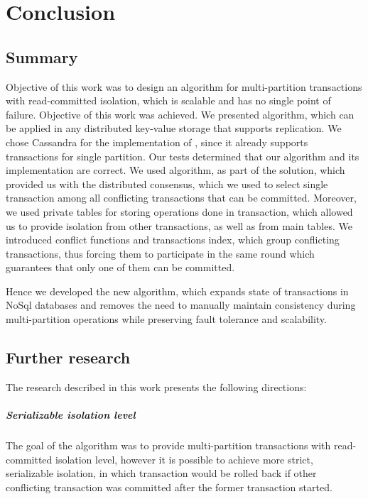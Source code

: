 
\chapter{Conclusion}\label{chapter:summary}

\section{Summary}
Objective of this work was to design an algorithm for multi-partition transactions with read-committed isolation, which is scalable and has no single point of failure. Objective of this work was achieved. We presented \mpt algorithm, which can be applied in any distributed key-value storage that supports replication.
We chose Cassandra for the implementation of \mpt, since it already supports transactions for single partition. Our tests determined that our algorithm and its implementation are correct. We used \paxos algorithm, as part of the solution, which provided us with the distributed consensus, which we used to select single transaction among all conflicting transactions that can be committed. Moreover, we used private tables for storing operations done in transaction, which allowed us to provide isolation from other transactions, as well as from main tables. We introduced conflict functions and transactions index, which group conflicting transactions, thus forcing them to participate in the same \paxos round which guarantees that only one of them can be committed.

Hence we developed the new algorithm, which expands state of transactions in NoSql databases and 
removes the need to manually maintain consistency during multi-partition operations 
while preserving fault tolerance and scalability. 


\section{Further research}
The research described in this work presents the following directions:

\paragraph{Serializable isolation level}
The goal of the algorithm was to provide multi-partition transactions with read-committed isolation level, however it is possible to achieve more strict, serializable isolation, in which transaction would be rolled back if other conflicting transaction was committed after the former transaction started. 

